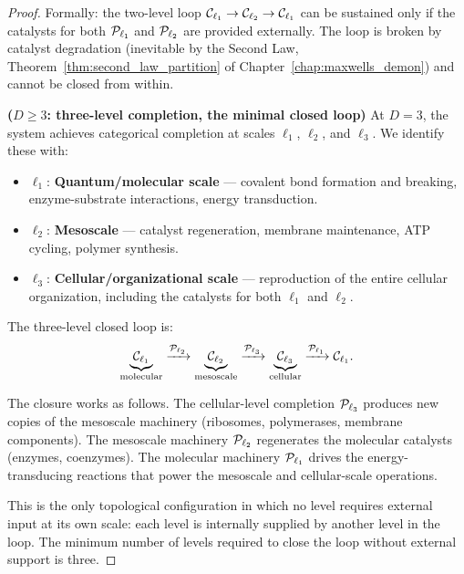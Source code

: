 \begin{proof}
Formally: the two-level loop $\mathcal{C}_{\ell_1} \to \mathcal{C}_{\ell_2} \to \mathcal{C}_{\ell_1}$
can be sustained only if the catalysts for both $\mathcal{P}_{\ell_1}$ and
$\mathcal{P}_{\ell_2}$ are provided externally. The loop is broken by catalyst
degradation (inevitable by the Second Law, Theorem~\ref{thm:second_law_partition}
of Chapter~\ref{chap:maxwells_demon}) and cannot be closed from within.

\medskip
\noindent\textbf{($D \geq 3$: three-level completion, the minimal closed loop)}
At $D = 3$, the system achieves categorical completion at scales $\ell_1$,
$\ell_2$, and $\ell_3$. We identify these with:
\begin{itemize}
  \item $\ell_1$: \textbf{Quantum/molecular scale} --- covalent bond formation and
        breaking, enzyme-substrate interactions, energy transduction.
  \item $\ell_2$: \textbf{Mesoscale} --- catalyst regeneration, membrane
        maintenance, ATP cycling, polymer synthesis.
  \item $\ell_3$: \textbf{Cellular/organizational scale} --- reproduction of the
        entire cellular organization, including the catalysts for both $\ell_1$
        and $\ell_2$.
\end{itemize}

The three-level closed loop is:
\begin{equation}
  \underbrace{\mathcal{C}_{\ell_1}}_{\text{molecular}} \xrightarrow{\mathcal{P}_{\ell_2}}
  \underbrace{\mathcal{C}_{\ell_2}}_{\text{mesoscale}} \xrightarrow{\mathcal{P}_{\ell_3}}
  \underbrace{\mathcal{C}_{\ell_3}}_{\text{cellular}} \xrightarrow{\mathcal{P}_{\ell_1}}
  \mathcal{C}_{\ell_1}.
  \label{eq:minimal_life_loop}
\end{equation}

The closure works as follows. The cellular-level completion $\mathcal{P}_{\ell_3}$
produces new copies of the mesoscale machinery (ribosomes, polymerases,
membrane components). The mesoscale machinery $\mathcal{P}_{\ell_2}$ regenerates
the molecular catalysts (enzymes, coenzymes). The molecular machinery
$\mathcal{P}_{\ell_1}$ drives the energy-transducing reactions that power the
mesoscale and cellular-scale operations.

This is the only topological configuration in which no level requires external
input at its own scale: each level is internally supplied by another level in
the loop. The minimum number of levels required to close the loop without
external support is three.


\end{proof}
